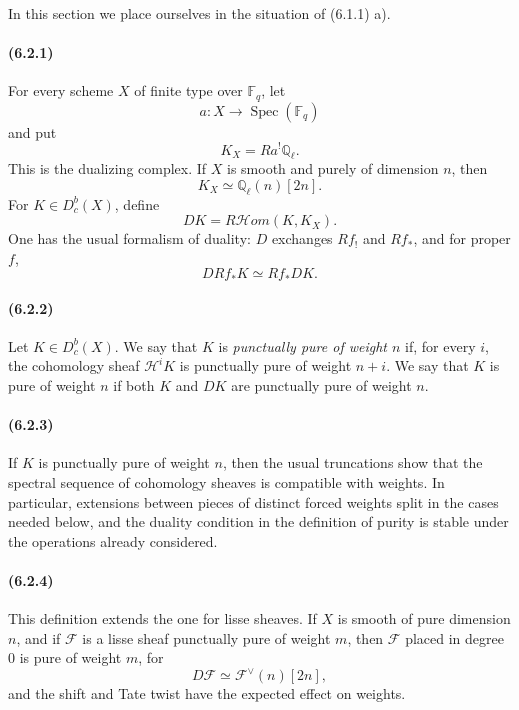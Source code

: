 \documentclass[11pt]{article}
\theoremstyle{remark}
\newcommand{\Ql}{\mathbb{Q}_\ell}
\newcommand{\Fq}{\mathbb{F}_q}
\begin{document}
In this section we place ourselves in the situation of (6.1.1) a).

\paragraph{(6.2.1)}
For every scheme \(X\) of finite type over \(\Fq\), let
\[
 a:X\longrightarrow \operatorname{Spec}(\Fq)
\]
and put
\[
K_X=Ra^!\Ql.
\]
This is the dualizing complex.  If \(X\) is smooth and purely of dimension \(n\), then
\[
K_X\simeq \Ql(n)[2n].
\]
For \(K\in D^b_c(X)\), define
\[
DK=R\mathcal Hom(K,K_X).
\]
One has the usual formalism of duality: \(D\) exchanges \(Rf_!\) and \(Rf_*\), and for proper \(f\),
\[
DRf_*K\simeq Rf_*DK.
\]

\paragraph{(6.2.2)}
Let \(K\in D^b_c(X)\).  We say that \(K\) is \emph{punctually pure of weight \(n\)} if, for every \(i\), the cohomology sheaf \(\mathcal H^iK\) is punctually pure of weight \(n+i\).  We say that \(K\) is pure of weight \(n\) if both \(K\) and \(DK\) are punctually pure of weight \(n\).

\paragraph{(6.2.3)}
If \(K\) is punctually pure of weight \(n\), then the usual truncations show that the spectral sequence of cohomology sheaves is compatible with weights.  In particular, extensions between pieces of distinct forced weights split in the cases needed below, and the duality condition in the definition of purity is stable under the operations already considered.

\paragraph{(6.2.4)}
This definition extends the one for lisse sheaves.  If \(X\) is smooth of pure dimension \(n\), and if \(\mathcal F\) is a lisse sheaf punctually pure of weight \(m\), then \(\mathcal F\) placed in degree \(0\) is pure of weight \(m\), for
\[
D\mathcal F\simeq \mathcal F^\vee(n)[2n],
\]
and the shift and Tate twist have the expected effect on weights.
\end{document}
